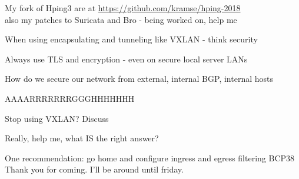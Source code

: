\documentclass[Screen16to9,17pt,footrule]{foils}
\begin{document}
\vskip 1cm
My fork of Hping3 are at \url{https://github.com/kramse/hping-2018}\\
also my patches to Suricata and Bro - being worked on, help me




\begin{list2}
\item When using encapsulating and tunneling like VXLAN - think security
\item Always use TLS and encryption - even on secure local server LANs
\item How do we secure our network from external, internal BGP, internal hosts
\item AAAARRRRRRRGGGHHHHHHH \smiley
\item Stop using VXLAN? Discuss
\end{list2}
\vskip 1cm
Really, help me, what IS the right answer? \smiley

\vskip 1cm

One recommendation: go home and configure ingress and egress filtering BCP38
\vskip 1cm
Thank you for coming. I'll be around until friday.
\end{document}

